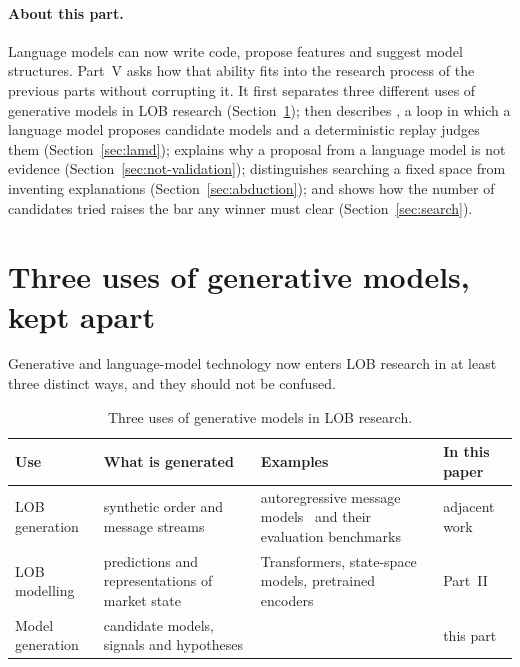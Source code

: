 \paragraph{About this part.} Language models can now write code, propose features and suggest model
structures. Part~V asks how that ability fits into the research process of the previous parts without
corrupting it. It first separates three different uses of generative models in LOB research
(Section~\ref{sec:three-uses}); then describes \lamd{}, a loop in which a language model proposes
candidate models and a deterministic replay judges them (Section~\ref{sec:lamd}); explains why a
proposal from a language model is not evidence (Section~\ref{sec:not-validation}); distinguishes
searching a fixed space from inventing explanations (Section~\ref{sec:abduction}); and shows how the
number of candidates tried raises the bar any winner must clear (Section~\ref{sec:search}).

\section{Three uses of generative models, kept apart}
\label{sec:three-uses}

Generative and language-model technology now enters LOB research in at least three distinct ways,
and they should not be confused.

\begin{table}[!htbp]
\centering\small
\caption{Three uses of generative models in LOB research.}
\label{tab:three-uses}
\begin{tabularx}{\linewidth}{lXXl}
\toprule
Use & What is generated & Examples & In this paper \\
\midrule
LOB generation & synthetic order and message streams & autoregressive message
  models~\citep{nagy2023} and their evaluation benchmarks~\citep{lobbench2025} & adjacent work \\
LOB modelling & predictions and representations of market state & Transformers, state-space models,
  pretrained encoders~\citep{linna2025lobert} & Part~II \\
Model generation & candidate models, signals and hypotheses & \lamd{} & this part \\
\bottomrule
\end{tabularx}
\end{table}

